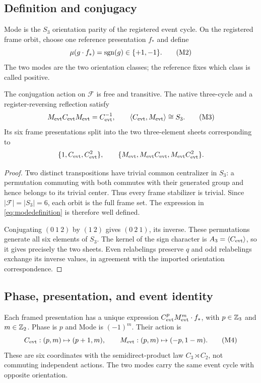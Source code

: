 \subsection*{Definition and conjugacy}
\begin{definition}[Mode]\label{def:mode}
Mode is the $S_3$ orientation parity of the registered event cycle. On the registered frame orbit, choose one reference presentation $f_*$ and define
\begin{equation}
\mu(g\cdot f_*)=\operatorname{sgn}(g)\in\{+1,-1\}.
\tag{M2}\label{eq:modedefinition}
\end{equation}
The two modes are the two orientation classes; the reference fixes which class is called positive.
\end{definition}
\begin{proposition}\label{prop:modealgebra}
The conjugation action on $\mathscr F$ is free and transitive. The native three-cycle and a register-reversing reflection satisfy
\begin{equation}
M_{\mathrm{evt}}C_{\mathrm{evt}}M_{\mathrm{evt}}=C_{\mathrm{evt}}^{-1},\qquad
\langle C_{\mathrm{evt}},M_{\mathrm{evt}}\rangle\cong S_3.
\tag{M3}\label{eq:modalconjugacy}
\end{equation}
Its six frame presentations split into the two three-element sheets corresponding to
\[
\{1,C_{\mathrm{evt}},C_{\mathrm{evt}}^2\},\qquad
\{M_{\mathrm{evt}},M_{\mathrm{evt}}C_{\mathrm{evt}},M_{\mathrm{evt}}C_{\mathrm{evt}}^2\}.
\]
\end{proposition}
\begin{proof}
Two distinct transpositions have trivial common centralizer in $S_3$: a permutation commuting with both commutes with their generated group and hence belongs to its trivial center. Thus every frame stabilizer is trivial. Since $|\mathscr F|=|S_3|=6$, each orbit is the full frame set. The expression in \eqref{eq:modedefinition} is therefore well defined.

Conjugating $(0\ 1\ 2)$ by $(1\ 2)$ gives $(0\ 2\ 1)$, its inverse. These permutations generate all six elements of $S_3$. The kernel of the sign character is $A_3=\langle C_{\mathrm{evt}}\rangle$, so it gives precisely the two sheets. Even relabelings preserve $q$ and odd relabelings exchange its inverse values, in agreement with the imported orientation correspondence.
\end{proof}

\subsection*{Phase, presentation, and event identity}
Each framed presentation has a unique expression $C_{\mathrm{evt}}^pM_{\mathrm{evt}}^m\cdot f_*$, with $p\in\mathbb Z_3$ and $m\in\mathbb Z_2$. Phase is $p$ and Mode is $(-1)^m$. Their action is
\begin{equation}
C_{\mathrm{evt}}:(p,m)\mapsto(p+1,m),\qquad
M_{\mathrm{evt}}:(p,m)\mapsto(-p,1-m).
\tag{M4}\label{eq:modalcoordinates}
\end{equation}
These are six coordinates with the semidirect-product law $C_3\rtimes C_2$, not commuting independent actions. The two modes carry the same event cycle with opposite orientation.

